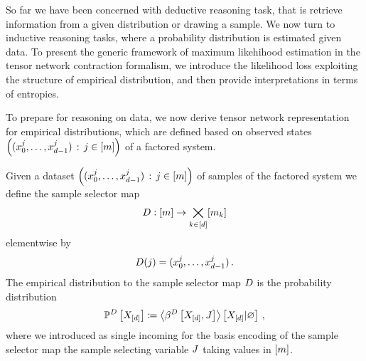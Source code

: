 
So far we have been concerned with deductive reasoning task, that is retrieve information from a given distribution or drawing a sample.
We now turn to inductive reasoning tasks, where a probability distribution is estimated given data.
To present the generic framework of maximum likehihood estimation in the tensor network contraction formalism, we introduce the likelihood loss exploiting the structure of empirical distribution, and then provide interpretations in terms of entropies.

\label{sec:empDistribution}

To prepare for reasoning on data, we now derive tensor network representation for empirical distributions, which are defined based on observed states $\left(({x_{0}^{j},\ldots,x_{d-1}^{j}})\,:\,j\in[m]\right)$ of a factored system.

\begin{definition}
    \label{def:dataMap}
    Given a dataset $\left(({x_{0}^{j},\ldots,x_{d-1}^{j}})\,:\,j\in[m]\right)$ of samples of the factored system we define the sample selector map
    \begin{align*}
        D : [m] \rightarrow \bigtimes_{k\in[d]}[m_{k}]
    \end{align*}
    elementwise by
    \begin{align*}
        D(j) = ({x_{0}^{j},\ldots,x_{d-1}^{j}}) \, .
    \end{align*}
    The empirical distribution to the sample selector map $D$ is the probability distribution
    \begin{align*}
        \mathbb{P}^{D}\left[X_{[d]}\right]
        \coloneqq \left\langle \beta^{D}\left[X_{[d]},J\right]\right\rangle \left[ X_{[d]} | \varnothing \right] \, ,
    \end{align*}
    where we introduced as single incoming for the basis encoding of the sample selector map the sample selecting variable $J$ taking values in $[m]$.
\end{definition}

